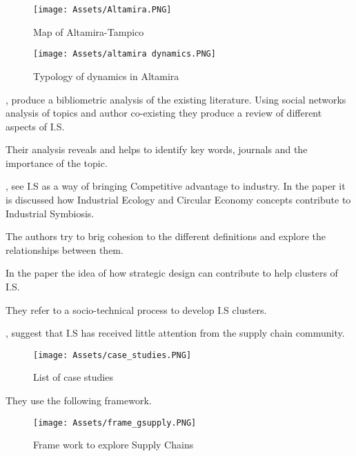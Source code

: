 \begin{figure}[h!]
    \centering
    \texttt{[image: Assets/Altamira.PNG]}
    \caption{Map of Altamira-Tampico}
    \label{fig:altamiramap}
\end{figure}



\begin{figure}[h!]
    \centering
    \texttt{[image: Assets/altamira dynamics.PNG]}
    \caption{Typology of dynamics in Altamira}
    \label{fig:altamira_example}
\end{figure}




\textbf{}\par
\textcite{Huang2019}, produce a bibliometric analysis of the existing literature. Using social networks analysis of topics and author co-existing they produce a review of different aspects of I.S.\par
Their analysis reveals and helps to identify key words, journals and the importance of the topic. 

\textbf{}\par
\textcite{Baldassarre2019}, see I.S as a way of bringing Competitive advantage to industry. In the paper it is discussed how Industrial Ecology and Circular Economy concepts contribute to Industrial Symbiosis.\par
The authors try to brig cohesion to the different definitions and explore the relationships between them.\par
In the paper the idea of how strategic design can contribute to help clusters of I.S.\par
They refer to a socio-technical process to develop I.S clusters.


\textbf{}\par
\textcite{Herczeg2018}, suggest that I.S has received little attention from the supply chain community.  \par

\begin{figure}[h!]
    \centering
    \texttt{[image: Assets/case\_studies.PNG]}
    \caption{List of case studies}
    \label{fig:case_studies}
\end{figure}


They use the following framework.

\begin{figure}[h!]
    \centering
    \texttt{[image: Assets/frame\_gsupply.PNG]}
    \caption{Frame work to explore Supply Chains}
    \label{fig:Supply chain explore}
\end{figure}


